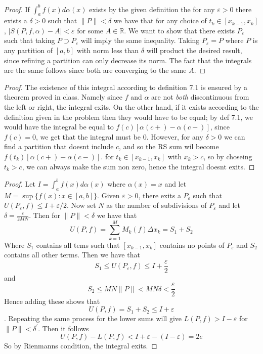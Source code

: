 \documentclass[11pt,largemargins]{homework}
\newcommand{\R}{\mathbb{R}}
\newcommand{\eps}{\varepsilon}
\newcommand{\itab}{\int_a^b f(x)d\alpha(x)}
\begin{document}
\maketitle
\question 

\begin{alphaparts} 
	\questionpart  
	\begin{proof} 
If $\itab$ exists by the given definition the for any $\eps > 0$ there exists a $\delta > 0$ such that $\| P \| < \delta$ we have that for any choice of $t_k \in [x_{k-1}, x_{k}]$, 
$|S(P, f, \alpha) - A | < \eps$ for some $A \in \R$. We want to show that there exists $P_\eps$ 
such that taking $P \supset P_\eps$ will imply the same inequality. Taking $P_\eps = P$ where 
$P$ is any partition of $[a, b]$ with norm less than $\delta$ will product the desired result, 
since refining a partition can only decrease its norm. The fact that the integrals are the same 
follows since both are converging to the same $A$. 
\end{proof}
\questionpart  

\begin{proof} 
The existence of this integral according to definition 7.1 is ensured by a theorem proved in class. 
Namely since $f$ and $\alpha$ are not \emph{both} discontinuous from the left or right, the integral exits. On the other hand, if it exists according to the definition given in the problem then they would
have to be equal; by def 7.1, we would have the integral be equal to $f(c)[\alpha(c+) - \alpha(c-)] $, since $f(c) = 0$, we get that the integral must be 0. However, for any $\delta > 0$ we can find a partition that doesnt include $c$, and so the RS sum wil become $f(t_k)[\alpha(c+) - \alpha(c-)]$. 
for $t_k \in [x_{k-1}, x_k]$ with $x_k > c$, so by choseing $t_k > c$, we can always make the sum non zero, hence the integral doesnt exits. 
\end{proof} 
\end{alphaparts} 

\question 

\begin{proof} 
	Let $I = \itab$ where $\alpha(x) =x$ and let $M= \sup\{f(x) : x \in [a, b]\} $. 
	Given $\eps > 0$, there exits a $P_\eps$ such that $U(P_\eps, f) \leq I + \eps/2$. 
	Now set $N$ as the number of subdivisions of $P_\eps$ and let $\delta = \frac{\eps}{2MN}$. 
	Then for $\|P\| < \delta$ we have that 
	\[ U(P, f) = \sum_{k= 1}^M  M_k(f) \Delta x_k = S_1 + S_2 \] 
	Where $S_1$ contains all tems such that $[x_{k-1}, x_k]$ contains no points of $P_\eps$ and $S_2$ contains all other terms. 
	Then we have that 
	\[ S_1 \leq U(P_\eps, f) \leq I + \frac{\eps}{2} \] 
	and 
	\[ S_2 \leq MN \|P\| < MN \delta < \frac{\eps}{2} \]
	Hence adding these shows that 
	\[ U(P, f) = S_1 + S_2 \leq I + \eps\] 
	. Repeating the same process for the lower sums will give $L(P, f) > I - \eps$ for $\|P\| < \delta^\prime$. 
	Then it follows 
	\[ U(P, f) - L(P, f) < I + \eps - (I - \eps) = 2e \] 
	So by Rienmanns condition, the integral exits. 
\end{proof}
\end{document}
